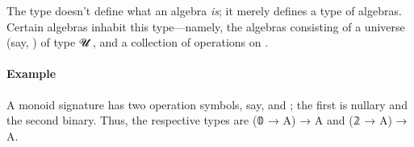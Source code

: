 \documentclass[a4paper,USenglish,cleveref,autoref,thm-restate]{lipics-v2019}
\begin{document}
The type \algebraUS doesn't define what an algebra \emph{is}; it merely defines a type of algebras. Certain algebras inhabit this type---namely, the algebras consisting of a universe (say, ) of type \ab 𝓤 ̇, and a collection \AgdaSymbol{(}\AgdaSpace{}\AgdaSymbol{:}\AgdaSpace{}\AgdaSpace{}%
\AgdaSpace{}\AgdaSymbol{)}\AgdaSpace{}\AgdaSpace{}\AgdaSpace{}\AgdaSymbol{(}\AgdaSpace{}\AgdaSpace{}\AgdaSpace{}\AgdaSymbol{)}\AgdaSpace{} of operations on .

\paragraph*{Example} A monoid signature has two operation symbols, say,  and ; the first is nullary and the second binary. Thus, the respective types are (𝟘 → A) → A and (𝟚 → A) → A.
\begin{code}%
\>[0]\AgdaSpace{}%
\AgdaSpace{}%
\AgdaSymbol{:}\AgdaSpace{}%
\AgdaSpace{}%
\AgdaSpace{}%
\<%
\\
\>[0][@{}l@{\AgdaIndent{0}}]%
\>[1]\AgdaSpace{}%
\AgdaSymbol{:}\AgdaSpace{}%
\<%
\\
%
\>[1]\AgdaSpace{}%
\AgdaSymbol{:}\AgdaSpace{}%
\<%
\\
%
\\[\AgdaEmptyExtraSkip]%
\>[0]\AgdaSpace{}%
\AgdaSymbol{:}\AgdaSpace{}%
\AgdaSpace{}%
\AgdaSymbol{\AgdaUnderscore{}}\AgdaSpace{}%
\AgdaSymbol{\AgdaUnderscore{}}\<%
\\
\>[0]\AgdaSpace{}%
\AgdaSymbol{=}\AgdaSpace{}%
\AgdaSpace{}%
\AgdaOperator{\AgdaInductiveConstructor{,}}\AgdaSpace{}%
\AgdaSpace{}%
\AgdaSymbol{\{}\AgdaSpace{}%
\AgdaSpace{}%
\AgdaSpace{}%
\AgdaSymbol{;}\AgdaSpace{}%
\AgdaSpace{}%
\AgdaSpace{}%
\AgdaSpace{}%
\AgdaSymbol{\}}\<%
\end{code}
\end{document}
